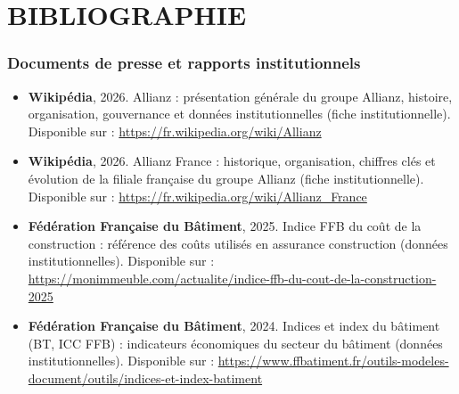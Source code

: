 \chapter*{BIBLIOGRAPHIE}
{}

\vspace{0.5cm}

\subsection*{Documents de presse et rapports institutionnels}

\begin{itemize}[leftmargin=1.5cm]

    \item \textbf{Wikipédia}, 2026. Allianz : présentation générale du groupe Allianz, histoire, organisation, gouvernance et données institutionnelles (fiche institutionnelle).  
    Disponible sur : \url{https://fr.wikipedia.org/wiki/Allianz}

    \item \textbf{Wikipédia}, 2026. Allianz France : historique, organisation, chiffres clés et évolution de la filiale française du groupe Allianz (fiche institutionnelle).  
    Disponible sur : \url{https://fr.wikipedia.org/wiki/Allianz_France}

    \item \textbf{Fédération Française du Bâtiment}, 2025. Indice FFB du coût de la construction : référence des coûts utilisés en assurance construction (données institutionnelles).  
    Disponible sur : \url{https://monimmeuble.com/actualite/indice-ffb-du-cout-de-la-construction-2025}

    \item \textbf{Fédération Française du Bâtiment}, 2024. Indices et index du bâtiment (BT, ICC FFB) : indicateurs économiques du secteur du bâtiment (données institutionnelles).  
    Disponible sur : \url{https://www.ffbatiment.fr/outils-modeles-document/outils/indices-et-index-batiment}

\end{itemize}

\vspace{0.3cm}

